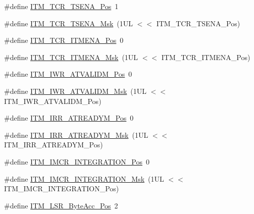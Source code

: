 \begin{DoxyCompactItemize}
\item 
\#define \mbox{\hyperlink{group___c_m_s_i_s___i_t_m_ga5aa381845f810114ab519b90753922a1}{I\+T\+M\+\_\+\+T\+C\+R\+\_\+\+T\+S\+E\+N\+A\+\_\+\+Pos}}~1
\item 
\#define \mbox{\hyperlink{group___c_m_s_i_s___i_t_m_ga436b2e8fa24328f48f2da31c00fc9e65}{I\+T\+M\+\_\+\+T\+C\+R\+\_\+\+T\+S\+E\+N\+A\+\_\+\+Msk}}~(1\+U\+L $<$$<$ I\+T\+M\+\_\+\+T\+C\+R\+\_\+\+T\+S\+E\+N\+A\+\_\+\+Pos)
\item 
\#define \mbox{\hyperlink{group___c_m_s_i_s___i_t_m_ga3286b86004bce7ffe17ee269f87f8d9d}{I\+T\+M\+\_\+\+T\+C\+R\+\_\+\+I\+T\+M\+E\+N\+A\+\_\+\+Pos}}~0
\item 
\#define \mbox{\hyperlink{group___c_m_s_i_s___i_t_m_ga7dd53e3bff24ac09d94e61cb595cb2d9}{I\+T\+M\+\_\+\+T\+C\+R\+\_\+\+I\+T\+M\+E\+N\+A\+\_\+\+Msk}}~(1\+U\+L $<$$<$ I\+T\+M\+\_\+\+T\+C\+R\+\_\+\+I\+T\+M\+E\+N\+A\+\_\+\+Pos)
\item 
\#define \mbox{\hyperlink{group___c_m_s_i_s___i_t_m_ga04d3f842ad48f6a9127b4cecc963e1d7}{I\+T\+M\+\_\+\+I\+W\+R\+\_\+\+A\+T\+V\+A\+L\+I\+D\+M\+\_\+\+Pos}}~0
\item 
\#define \mbox{\hyperlink{group___c_m_s_i_s___i_t_m_ga67b969f8f04ed15886727788f0e2ffd7}{I\+T\+M\+\_\+\+I\+W\+R\+\_\+\+A\+T\+V\+A\+L\+I\+D\+M\+\_\+\+Msk}}~(1\+U\+L $<$$<$ I\+T\+M\+\_\+\+I\+W\+R\+\_\+\+A\+T\+V\+A\+L\+I\+D\+M\+\_\+\+Pos)
\item 
\#define \mbox{\hyperlink{group___c_m_s_i_s___i_t_m_ga259edfd1d2e877a62e06d7a240df97f4}{I\+T\+M\+\_\+\+I\+R\+R\+\_\+\+A\+T\+R\+E\+A\+D\+Y\+M\+\_\+\+Pos}}~0
\item 
\#define \mbox{\hyperlink{group___c_m_s_i_s___i_t_m_ga3dbc3e15f5bde2669cd8121a1fe419b9}{I\+T\+M\+\_\+\+I\+R\+R\+\_\+\+A\+T\+R\+E\+A\+D\+Y\+M\+\_\+\+Msk}}~(1\+U\+L $<$$<$ I\+T\+M\+\_\+\+I\+R\+R\+\_\+\+A\+T\+R\+E\+A\+D\+Y\+M\+\_\+\+Pos)
\item 
\#define \mbox{\hyperlink{group___c_m_s_i_s___i_t_m_ga08de02bf32caf48aaa29f7c68ff5d755}{I\+T\+M\+\_\+\+I\+M\+C\+R\+\_\+\+I\+N\+T\+E\+G\+R\+A\+T\+I\+O\+N\+\_\+\+Pos}}~0
\item 
\#define \mbox{\hyperlink{group___c_m_s_i_s___i_t_m_ga8838bd3dd04c1a6be97cd946364a3fd2}{I\+T\+M\+\_\+\+I\+M\+C\+R\+\_\+\+I\+N\+T\+E\+G\+R\+A\+T\+I\+O\+N\+\_\+\+Msk}}~(1\+U\+L $<$$<$ I\+T\+M\+\_\+\+I\+M\+C\+R\+\_\+\+I\+N\+T\+E\+G\+R\+A\+T\+I\+O\+N\+\_\+\+Pos)
\item 
\#define \mbox{\hyperlink{group___c_m_s_i_s___i_t_m_gabfae3e570edc8759597311ed6dfb478e}{I\+T\+M\+\_\+\+L\+S\+R\+\_\+\+Byte\+Acc\+\_\+\+Pos}}~2
$$
\end{DoxyCompactItemize}
